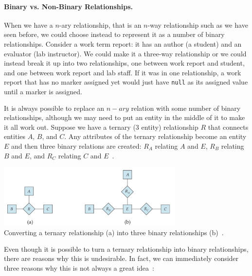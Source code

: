 \paragraph{Binary vs. Non-Binary Relationships.}
When we have a $n$-ary relationship, that is an $n$-way relationship such as we have seen before, we could choose instead to represent it as a number of binary relationships. Consider a work term report: it has an author (a student) and an evaluator (lab instructor). We could make it a three-way relationship or we could instead break it up into two relationships, one between work report and student, and one between work report and lab staff. If it was in one relationship, a work report that has no marker assigned yet would just have \texttt{null} as its assigned value until a marker is assigned.  

It is always possible to replace an $n-ary$ relation with some number of binary relationships, although we may need to put an entity in the middle of it to make it all work out. Suppose we have a ternary (3 entity) relationship $R$ that connects entities $A$, $B$, and $C$. Any attributes of the ternary relationship become an entity $E$ and then three binary relations are created: $R_{A}$ relating $A$ and $E$, $R_{B}$ relating $B$ and $E$, and $R_{C}$ relating $C$ and $E$~\cite{dsc}.

\begin{center}
\includegraphics[width=0.7\textwidth]{images/ternary-to-binary}\\
Converting a ternary relationship (a) into three binary relationships (b)~\cite{dsc}.
\end{center}

Even though it is possible to turn a ternary relationship into binary relationships, there are reasons why this is undesirable. In fact, we can immediately consider three reasons why this is not always a great idea~\cite{dsc}:


